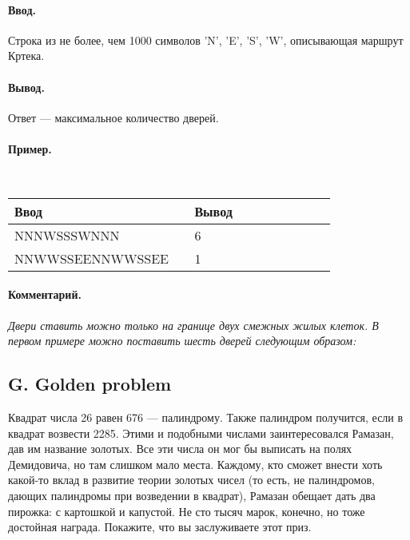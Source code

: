 \documentclass[12pt, a4paper]{article}
\newcommand{\informat}[1]
{
	\paragraph{Ввод.\\} #1
}
\newcommand{\outformat}[1]
{
	\paragraph{Вывод.\\} #1
}
\newcommand{\examplee}[4]
{
	\paragraph{Пример.\\}
	{\tt
	\begin{tabular}{|p{0.4\linewidth}|p{0.4\linewidth}|}
	\hline
	Ввод 	& Вывод  	\\
	\hline
	#1 		& #2 		\\
	\hline
	#3		& #4		\\
	\hline
	\end{tabular}
	}
}
\newcommand{\excomm}[1]
{
	\paragraph{Комментарий. \\}
	\textit{#1}
}
\begin{document}
\informat{Строка из не более, чем 1000 символов 'N', 'E', 'S', 'W', описывающая маршрут Кртека.}

\outformat{Ответ --- максимальное количество дверей.}

\examplee{NNNWSSSWNNN}{6}
{NNWWSSEENNWWSSEE}{1}

\excomm{Двери ставить можно только на границе двух смежных жилых клеток. В первом примере можно поставить шесть дверей следующим образом: }

\begin{center}
\end{center}




\subsection*{G. Golden problem}


Квадрат числа 26 равен 676 --- палиндрому. Также палиндром получится, если в квадрат возвести 2285. Этими и подобными числами заинтересовался Рамазан, дав им название золотых. Все эти числа он мог бы выписать на полях Демидовича, но там слишком мало места. Каждому, кто сможет внести хоть какой-то вклад в развитие теории золотых чисел (то есть, не палиндромов, дающих палиндромы при возведении в квадрат), Рамазан обещает дать два пирожка: с картошкой и капустой. Не сто тысяч марок, конечно, но тоже до\-стой\-ная награда. Покажите, что вы заслуживаете этот приз.
\end{document}
